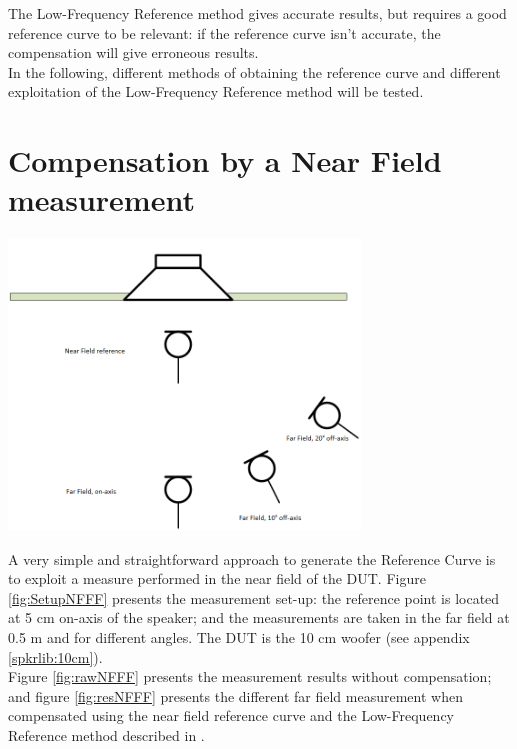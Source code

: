 \documentclass{report}
\begin{document}
\vspace{0.2cm}

The Low-Frequency Reference method gives accurate results, but requires a good reference curve to be relevant: if the reference curve isn't accurate, the compensation will give erroneous results. \\
In the following, different methods of obtaining the reference curve and different exploitation of the Low-Frequency Reference method will be tested. 

\section{Compensation by a Near Field measurement}

\begin{minipage}{0.4\textwidth}
\begin{center}
	\includegraphics[width=0.7\textwidth]{RoomComp/NFFF_Setup} 
    \captionsetup{hypcap=false} 
	\label{fig:SetupNFFF}
\end{center}
\end{minipage}
\begin{minipage}{0.6\textwidth}
A very simple and straightforward approach to generate the Reference Curve is to exploit a measure performed in the near field of the DUT. Figure \ref{fig:SetupNFFF} presents the measurement set-up: the reference point is located at 5 cm on-axis of the speaker; and the measurements are taken in the far field at 0.5 m and for different angles. The DUT is the 10 cm woofer (see appendix \ref{spkrlib:10cm}). \\

Figure \ref{fig:rawNFFF} presents the measurement results without compensation; and figure \ref{fig:resNFFF} presents the different far field measurement when compensated using the near field reference curve and the Low-Frequency Reference method described in \citep[][sect.~4]{aeswb}. 
\end{minipage}
\end{document}
